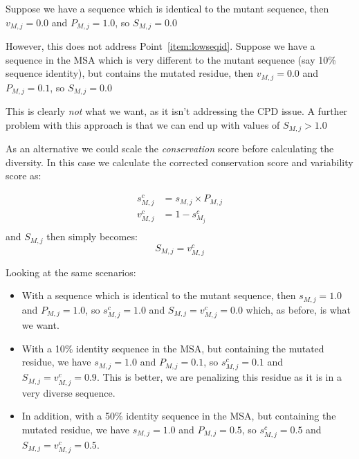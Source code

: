 \documentclass[a4paper]{article}
\begin{document}
Suppose we have a sequence which is identical to the
mutant sequence, then $v_{M, j} = 0.0$ and $P_{M, j} = 1.0$, so
$S_{M,j} = 0.0$

However, this does not address Point~\ref{item:lowseqid}.
Suppose we have a sequence in the MSA which is very different to the mutant
sequence (say 10\% sequence identity), but contains the mutated
residue, then $v_{M, j} = 0.0$ and $P_{M, j} = 0.1$, so $S_{M,j} =
0.0$

This is clearly \emph{not} what we want, as it isn't addressing the CPD
issue. A further problem with this approach is that we can end up with
values of $S_{M,j} > 1.0$

As an alternative we could scale the \emph{conservation} score before
calculating the diversity. In this case we calculate the corrected
conservation score and variability score as:

\begin{equation}
  \begin{array}{ll}
    s^c_{M,j} & = s_{M,j} \times P_{M, j} \\
    v^c_{M,j} & = 1 - s^c_{M_j} \\
  \end{array}
\end{equation}
and $S_{M,j}$ then simply becomes:
\begin{equation}
  S_{M,j} = v^c_{M, j}
\end{equation}

Looking at the same scenarios:

\begin{itemize}  
\item With a sequence which is identical to the mutant sequence, then
  $s_{M, j} = 1.0$ and $P_{M, j} = 1.0$, so $s^c_{M,j} = 1.0$ and
  $S_{M,j} = v^c_{M,j} = 0.0$ which, as before, is what we want.

\item With a 10\% identity sequence in the MSA, but containing the
  mutated residue, we have $s_{M, j} = 1.0$ and $P_{M, j} = 0.1$, so
  $s^c_{M,j} = 0.1$ and $S_{M,j} = v^c_{M,j} = 0.9$. This is
  better, we are penalizing this residue as it is in a very diverse
  sequence.

\item In addition, with a 50\% identity sequence in the MSA, but
  containing the mutated residue, we have $s_{M, j} = 1.0$ and $P_{M,
    j} = 0.5$, so $s^c_{M,j} = 0.5$ and $S_{M,j} = v^c_{M,j} =
  0.5$.
\end{itemize}  
\end{document}
